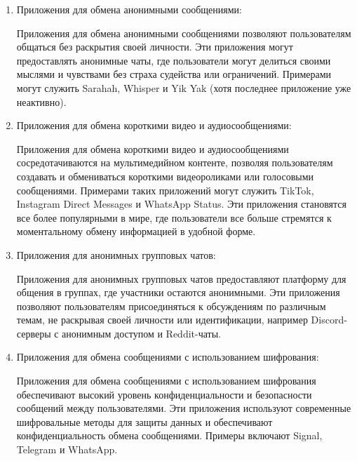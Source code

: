 \begin{enumerate}
	\item Приложения для обмена анонимными сообщениями:
	
	Приложения для обмена анонимными сообщениями позволяют пользователям общаться без раскрытия своей личности. Эти приложения могут предоставлять анонимные чаты, где пользователи могут делиться своими мыслями и чувствами без страха судейства или ограничений. Примерами могут служить Sarahah, Whisper и Yik Yak (хотя последнее приложение уже неактивно).
	
	\item Приложения для обмена короткими видео и аудиосообщениями:
	
	Приложения для обмена короткими видео и аудиосообщениями сосредотачиваются на мультимедийном контенте, позволяя пользователям создавать и обмениваться короткими видеороликами или голосовыми сообщениями. Примерами таких приложений могут служить TikTok, Instagram Direct Messages и WhatsApp Status. Эти приложения становятся все более популярными в мире, где пользователи все больше стремятся к моментальному обмену информацией в удобной форме.
	
	\item Приложения для анонимных групповых чатов:
	
	Приложения для анонимных групповых чатов предоставляют платформу для общения в группах, где участники остаются анонимными. Эти приложения позволяют пользователям присоединяться к обсуждениям по различным темам, не раскрывая своей личности или идентификации, например Discord-серверы с анонимным доступом и Reddit-чаты.
	
	\item Приложения для обмена сообщениями с использованием шифрования:
	
	Приложения для обмена сообщениями с использованием шифрования обеспечивают высокий уровень конфиденциальности и безопасности сообщений между пользователями. Эти приложения используют современные шифровальные методы для защиты данных и обеспечивают конфиденциальность обмена сообщениями. Примеры включают Signal, Telegram и WhatsApp.
\end{enumerate}